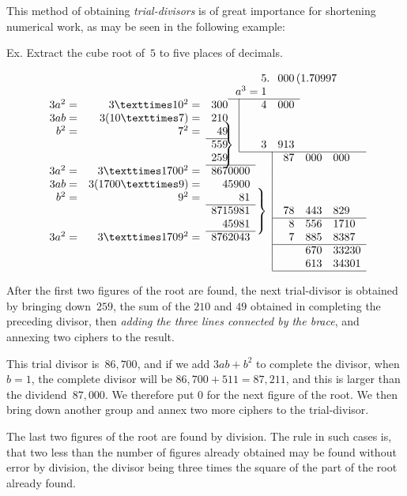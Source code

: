 \documentclass[12pt]{book}[2005/09/16]
\makeatletter
\newenvironment{Soln}[1][]{\par\small\textsc{#1}}{\par}
\newcommand{\TbBar}[1]{\multicolumn{1}{@{}r|}{#1}}
\newcommand{\threelines}{\rule[-18pt]{0pt}{36pt}}
\newcommand{\BB}{\makebox[2pt][r]{\smash{$\left.\threelines\right\}$}}}
\makeatother
\begin{document}
This method of obtaining \emph{trial-divisors} is of great importance
for shortening numerical work, as may be seen in the
following example:

Ex.  Extract the cube root of~$5$ to five places of decimals.
\begin{Soln}
\[
\begin{array}{rrr@{}r@{}rcrrl}
        &               &    &    &&5\rlap{.}&\multicolumn{3}{l}{000\,(1.70997} \\
        &               && \multicolumn{3}{r}{a^{3} = 1} \\
\cline{4-7}
3a^{2} =&   3 × 10^{2} =& 300&\TbBar{}&&4&000 \\
   3ab =&    3(10 × 7) =& 210&\TbBar{} \\
 b^{2} =&        7^{2} =&  49&\TbBar{}\\
\cline{3-3}
        &               & 559&\TbBar{\BB}&&3&913 \\
\cline{5-9}
        &               & 259&  &  &\TbBar{}& 87& 000& 000 \\
\cline{3-5}
3a^{2} =& 3 × 1700^{2} =& 867&00&00&\TbBar{} \\
   3ab =&  3(1700 × 9) =&   4&59&00&\TbBar{} \\
 b^{2} =&        9^{2} =&    &  &81&\TbBar{} \\
\cline{3-5}
        &               & 871&59&81&\TbBar{\BB}& 78& 443& 829 \\
\cline{7-9}
        &               &   4&59&81&\TbBar{}&  8& 556& 1710 \\
\cline{3-5}
3a^{2} =& 3 × 1709^{2} =& 876&20&43&\TbBar{}&  7& 885& 8387 \\
\cline{7-9}
        &               &    &  &  &\TbBar{}&   & 670& 33230 \\
        &               &    &  &  &\TbBar{}&   & 613& 34301 \\
\cline{7-9}
\end{array}
\]

After the first two figures of the root are found, the next trial-divisor
is obtained by bringing down~$259$, the sum of the $210$ and $49$
obtained in completing the preceding divisor, then \emph{adding the three
lines connected by the brace}, and annexing two ciphers to the result.

This trial divisor is~$86,700$, and if we add $3ab + b^{2}$ to complete the
divisor, when $b = 1$, the complete divisor will be $86,700 + 511 = 87,211$,
and this is larger than the dividend~$87,000$.  We therefore put $0$ for
the next figure of the root.  We then bring down another group
and annex two more ciphers to the trial-divisor.

The last two figures of the root are found by division.  The rule
in such cases is, that two less than the number of figures already
obtained may be found without error by division, the divisor being
three times the square of the part of the root already found.
\end{Soln}
\end{document}
